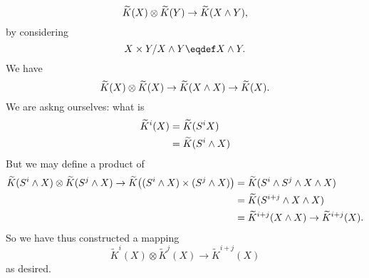 \begin{equation}
\widetilde{K}(X)\otimes\widetilde{K}(Y)\to\widetilde{K}(X\wedge Y),
\end{equation}
by considering
\begin{equation}
X\times Y/X\wedge Y\eqdef X\smashProd Y.
\end{equation}
We have
\begin{equation}
\widetilde{K}(X)\otimes\widetilde{K}(X)\to\widetilde{K}(X\wedge X)\to\widetilde{K}(X).
\end{equation}
We are askng ourselves: what is
\begin{equation}
\begin{split}
\widetilde{K}^{i}(X) &= \widetilde{K}(S^{i}X)\\
&=\widetilde{K}(S^{i}\wedge X)
\end{split}
\end{equation}
But we may define a product of
\begin{equation}
\begin{split}
\widetilde{K}(S^{i}\wedge
X)\otimes\widetilde{K}(S^{j}\wedge X)\to
\widetilde{K}\bigl((S^{i}\wedge X)\times(S^{j}\wedge X)\bigr)
&=\widetilde{K}(S^{i}\wedge S^{j}\wedge X\wedge X)\\
&=\widetilde{K}(S^{i+j}\wedge X\wedge X)\\
&=\widetilde{K}^{i+j}(X\wedge X)\to\widetilde{K}^{i+j}(X).
\end{split}
\end{equation}
So we have thus constructed a mapping
\begin{equation}
\widetilde{K}^{i}(X)\otimes\widetilde{K}^{j}(X)\to\widetilde{K}^{i+j}(X)
\end{equation}
as desired.
